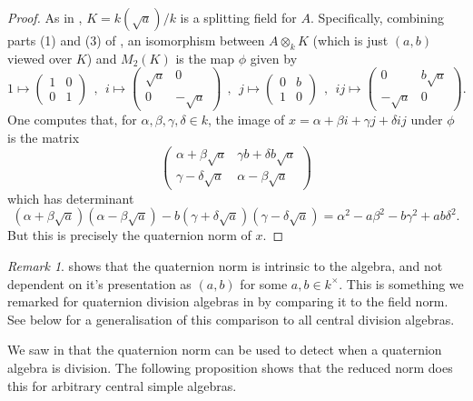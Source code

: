\documentclass[11pt]{amsart}
\numberwithin{equation}{section}
\theoremstyle{remark}
\newtheorem{remark}[equation]{Remark}
\theoremstyle{remark}
\theoremstyle{remark}
\theoremstyle{definition}
\theoremstyle{definition}
\theoremstyle{definition}
\theoremstyle{definition}
\theoremstyle{definition}
\theoremstyle{definition}
\begin{document}
\begin{proof}
As in , $K=k(\sqrt{a})/k$ is a splitting field for $A$. Specifically, combining parts (1) and (3) of , an isomorphism between $A\otimes_k K$ (which is just $(a,b)$ viewed over $K$) and $M_2(K)$ is the map $\phi$ given by
\[
1\mapsto\left(\begin{array}{cc}
1 & 0\\
0 & 1
\end{array}\right)~~,~~ 
i\mapsto \left(\begin{array}{cc}
\sqrt{a} & 0\\
0 & -\sqrt{a}
\end{array}\right)~~,~~j\mapsto\left(\begin{array}{cc}
0 & b\\
1 & 0
\end{array}\right)~~,~~ij \mapsto \left(\begin{array}{cc}
0 & b\sqrt{a}\\
-\sqrt{a} & 0
\end{array}\right).
\]
One computes that, for $\alpha,\beta,\gamma,\delta\in k$, the image of $x=\alpha +\beta i +\gamma j +\delta ij$ under $\phi$ is the matrix
\[\left(\begin{array}{cc}
\alpha+\beta \sqrt{a} & \gamma b+\delta b\sqrt{a}\\
\gamma-\delta \sqrt{a} & \alpha-\beta\sqrt{a}
\end{array}\right)\]
which has determinant
\[(\alpha+\beta \sqrt{a})(\alpha-\beta \sqrt{a})-b(\gamma+\delta\sqrt{a})(\gamma -\delta \sqrt{a})=\alpha^2-a\beta^2-b\gamma^2+ab\delta^2.\]
But this is precisely the quaternion norm of $x$.
\end{proof}

\begin{remark}
 shows that the quaternion norm is intrinsic to the algebra, and not dependent on it's presentation as $(a,b)$ for some $a,b\in k^{\times}$. This is something we remarked for quaternion division algebras in  by comparing it to the field norm. See  below for a generalisation of this comparison to all central division algebras. 
\end{remark}

We saw in  that the quaternion norm can be used to detect when a quaternion algebra is division. The following proposition shows that the reduced norm does this for arbitrary central simple algebras.
\end{document}
